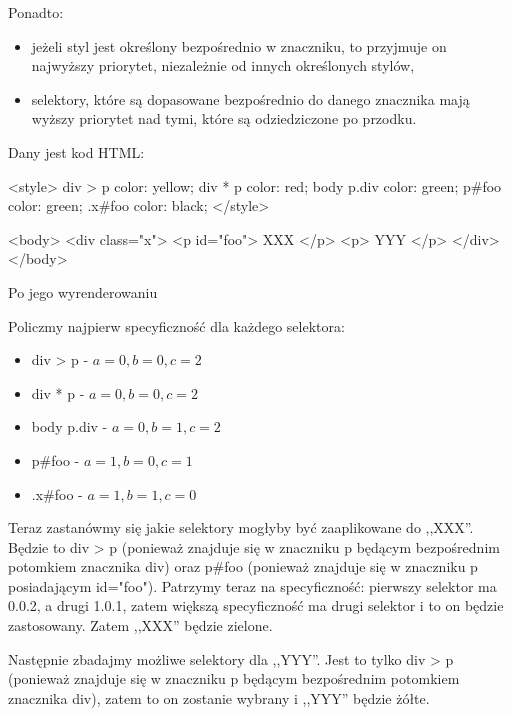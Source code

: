 Ponadto:
\begin{itemize}
    \item jeżeli styl jest określony bezpośrednio w znaczniku, to przyjmuje on najwyższy priorytet, niezależnie od innych określonych stylów,
    \item selektory, które są dopasowane bezpośrednio do danego znacznika mają wyższy priorytet nad tymi, które są odziedziczone po przodku.
\end{itemize}

\begin{exam}
    Dany jest kod HTML:
    \begin{html}
        <style>
            div > p { color: yellow; }
            div * p { color: red; }
            body p.div { color: green; }
            p#foo { color: green; }
            .x#foo { color: black; }
        </style>
        
        <body>
            <div class="x">
                <p id="foo"> XXX </p>
                <p> YYY </p>
            </div>
        </body>
    \end{html}
    Po jego wyrenderowaniu
    \bigskip

    Policzmy najpierw specyficzność dla każdego selektora:
    \begin{itemize}
        \item div > p - $a=0, b=0, c=2$
        \item div * p - $a=0, b=0, c=2$
        \item body p.div - $a=0, b=1, c=2$
        \item p\#foo - $a=1, b=0, c=1$
        \item .x\#foo - $a=1, b=1, c=0$
    \end{itemize}

    Teraz zastanówmy się jakie selektory mogłyby być zaaplikowane do ,,XXX''. Będzie to div > p (ponieważ znajduje się w znaczniku p będącym bezpośrednim potomkiem znacznika div) oraz p\#foo (ponieważ znajduje się w znaczniku p posiadającym id="foo"). Patrzymy teraz na specyficzność: pierwszy selektor ma 0.0.2, a drugi 1.0.1, zatem większą specyficzność ma drugi selektor i to on będzie zastosowany. Zatem ,,XXX'' będzie zielone.

    Następnie zbadajmy możliwe selektory dla ,,YYY''. Jest to tylko div > p (ponieważ znajduje się w znaczniku p będącym bezpośrednim potomkiem znacznika div), zatem to on zostanie wybrany i ,,YYY'' będzie żółte.
    
\end{exam}

